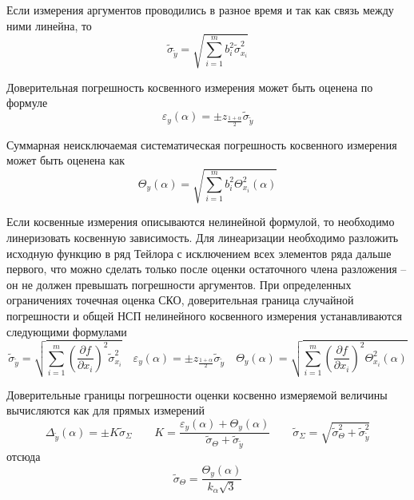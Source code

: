 \documentclass[12pt,a4paper]{article}
\begin{document}
Если измерения аргументов проводились в разное время и так как связь
между ними линейна, то
\begin{equation*}
  \tilde{\sigma}_{\tilde{y}} = \sqrt{\sum_{i=1}^{m} b_i^2 \tilde{\sigma}_{x_i}^2}
  \tag{5.3}
  \label{linear:indirect:stddev}
\end{equation*}

Доверительная погрешность косвенного измерения может быть оценена по формуле
\begin{equation*}
  \varepsilon_{y}(\alpha) = \pm z_{\frac{1+\alpha}{2}} \tilde{\sigma}_{\tilde{y}}
  \tag{5.4}
  \label{linear:indirect:confidence}
\end{equation*}

Суммарная неисключаемая систематическая погрешность косвенного измерения может быть оценена
как
\begin{equation*}
  \Theta_{y}(\alpha) = \sqrt{\sum_{i=1}^{m} b_i^2 \Theta_{x_i}^2(\alpha)}
  \tag{5.5}
  \label{linear:indirect:systematic}
\end{equation*}

Если косвенные измерения описываются нелинейной формулой, то необходимо линеризовать  
косвенную зависимость. Для линеаризации необходимо разложить исходную функцию в
ряд Тейлора с исключением всех элементов ряда дальше первого, что
можно сделать только после оценки остаточного члена разложения – он
не должен превышать погрешности аргументов. При определенных
ограничениях точечная оценка СКО, доверительная граница случайной
погрешности и общей НСП нелинейного косвенного измерения устанавливаются 
следующими формулами
\begin{equation*}
  \tilde{\sigma}_{\tilde{y}} = \sqrt{\sum_{i=1}^{m} \left(\frac{\partial f}{\partial x_i}\right)^2 \tilde{\sigma}_{x_i}^2} \quad \varepsilon_{y}(\alpha) = \pm z_{\frac{1+\alpha}{2}} \tilde{\sigma}_{\tilde{y}} \quad \Theta_{y}(\alpha) = \sqrt{\sum_{i=1}^{m} \left(\frac{\partial f}{\partial x_i}\right)^2 \Theta_{x_i}^2(\alpha)}
  \tag{5.6}
  \label{nonlinear:indirect}
\end{equation*}

Доверительные границы погрешности оценки косвенно измеряемой величины вычисляются 
как для прямых измерений
\begin{equation*}
  \Delta_{\tilde{y}}(\alpha) = \pm K \tilde{\sigma}_\Sigma \qquad K = \frac{\varepsilon_{y}(\alpha) + \Theta_{y}(\alpha)}{\tilde{\sigma}_\Theta + \tilde{\sigma}_{\tilde{y}}} \qquad \tilde{\sigma}_\Sigma = \sqrt{\tilde{\sigma}_\Theta^2 + \tilde{\sigma}_{\tilde{y}}^2}
  \tag{5.7}
  \label{nonlinear:indirect:confidence}
\end{equation*}
отсюда
\begin{equation*}
  \tilde{\sigma}_\Theta = \frac{\Theta_{y}(\alpha)}{k_\alpha\sqrt{3}}
\end{equation*}
\end{document}
